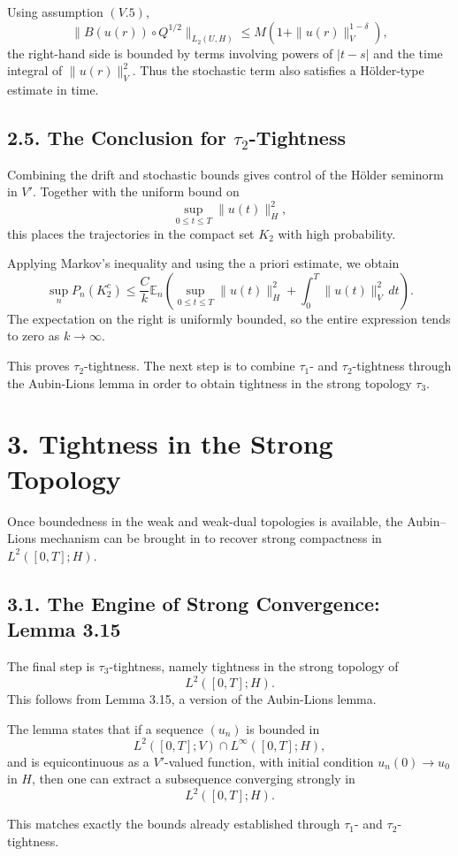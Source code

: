 \documentclass[11pt]{article}
\theoremstyle{definition}
\theoremstyle{remark}
\begin{document}
Using assumption \((V.5)\),
\[
\|B(u(r))\circ Q^{1/2}\|_{L_2(U,H)}
\le
M(1+\|u(r)\|_V^{1-\delta}),
\]
the right-hand side is bounded by terms involving powers of \(|t-s|\) and the time integral of \(\|u(r)\|_V^2\). Thus the stochastic term also satisfies a Hölder-type estimate in time.

\subsection*{2.5. The Conclusion for \(\tau_2\)-Tightness}
Combining the drift and stochastic bounds gives control of the Hölder seminorm in \(V'\). Together with the uniform bound on
\[
\sup_{0\le t\le T}\|u(t)\|_H^2,
\]
this places the trajectories in the compact set \(K_2\) with high probability.

Applying Markov's inequality and using the a priori estimate, we obtain
\[
\sup_n P_n(K_2^c)
\le
\frac{C}{k}
\mathbb E_n\left(
\sup_{0\le t\le T}\|u(t)\|_H^2
+
\int_0^T \|u(t)\|_V^2\,dt
\right).
\]
The expectation on the right is uniformly bounded, so the entire expression tends to zero as \(k\to\infty\).

This proves \(\tau_2\)-tightness. The next step is to combine \(\tau_1\)- and \(\tau_2\)-tightness through the Aubin-Lions lemma in order to obtain tightness in the strong topology \(\tau_3\).

\section*{3. Tightness in the Strong Topology}
Once boundedness in the weak and weak-dual topologies is available, the Aubin--Lions mechanism can be brought in to recover strong compactness in \(L^2([0,T];H)\).

\subsection*{3.1. The Engine of Strong Convergence: Lemma 3.15}
The final step is \(\tau_3\)-tightness, namely tightness in the strong topology of
\[
L^2([0,T];H).
\]
This follows from Lemma 3.15, a version of the Aubin-Lions lemma.

The lemma states that if a sequence \((u_n)\) is bounded in
\[
L^2([0,T];V)\cap L^\infty([0,T];H),
\]
and is equicontinuous as a \(V'\)-valued function, with initial condition \(u_n(0)\to u_0\) in \(H\), then one can extract a subsequence converging strongly in
\[
L^2([0,T];H).
\]

This matches exactly the bounds already established through \(\tau_1\)- and \(\tau_2\)-tightness.
\end{document}
